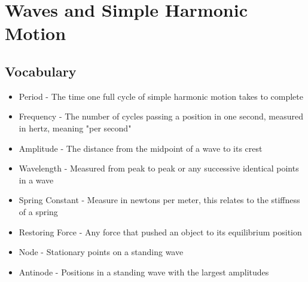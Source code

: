 \section{Waves and Simple Harmonic Motion}

\subsection{Vocabulary}
\begin{itemize}
    \item Period - The time one full cycle of simple harmonic motion takes to complete
    \item Frequency - The number of cycles passing a position in one second, measured in hertz, meaning "per second"
    \item Amplitude - The distance from the midpoint of a wave to its crest
    \item Wavelength - Measured from peak to peak or any successive identical points in a wave
    \item Spring Constant - Measure in newtons per meter, this relates to the stiffness of a spring
    \item Restoring Force - Any force that pushed an object to its equilibrium position
    \item Node - Stationary points on a standing wave
    \item Antinode - Positions in a standing wave with the largest amplitudes
\end{itemize}


